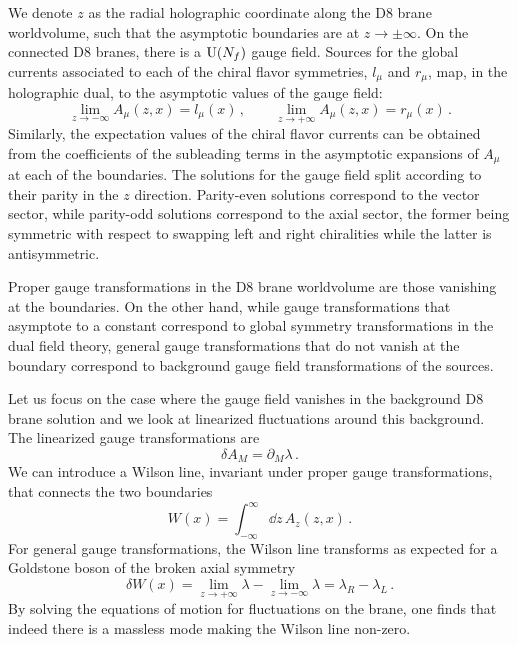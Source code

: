 We denote $z$ as the radial holographic coordinate along the D8 brane worldvolume, such that the asymptotic boundaries are at $z\to \pm\infty$.
On the connected D8 branes, there is a $\mathrm{U}(N_f)$ gauge field.
Sources for the global currents associated to each of the chiral flavor symmetries, $l_\mu$ and $r_\mu$, map, in the holographic dual, to the asymptotic values of the gauge field:
\begin{equation}
	\lim_{z\to-\infty} A_\mu(z,x)=l_\mu(x)
	\,,\qquad 
	\lim_{z\to+\infty} A_\mu(z,x)=r_\mu(x)\,.
\end{equation}
Similarly, the expectation values of the chiral flavor currents can be obtained from the coefficients of the subleading terms in the asymptotic expansions of $A_\mu$ at each of the boundaries.
The solutions for the gauge field split according to their parity in the $z$ direction.
Parity-even solutions correspond to the vector sector, while parity-odd solutions correspond to the axial sector, the former being symmetric with respect to swapping left and right chiralities while the latter is antisymmetric. 

Proper gauge transformations in the D8 brane worldvolume are those vanishing at the boundaries.
On the other hand, while gauge transformations that asymptote to a constant correspond to global symmetry transformations in the dual field theory, general gauge transformations that do not vanish at the boundary correspond to background gauge field transformations of the sources. 

Let us focus on the case where the gauge field vanishes in the background D8 brane solution and we look at linearized fluctuations around this background.
The linearized gauge transformations are
\begin{equation}
	\delta A_M=\partial_M \lambda\,.
\end{equation}
We can introduce a Wilson line, invariant under proper gauge transformations, that connects the two boundaries 
\begin{equation}
     W(x)=\int_{-\infty}^\infty \dd z\, A_z(z,x)\,.
\end{equation}
For general gauge transformations, the Wilson line transforms as expected for a Goldstone boson of the broken axial symmetry
\begin{equation}
	\delta W(x)=\lim_{z\to +\infty} \lambda-\lim_{z\to-\infty} \lambda=\lambda_R-\lambda_L
	\,.
\end{equation}
By solving the equations of motion for fluctuations on the brane, one finds that indeed there is a massless mode making the Wilson line non-zero.

